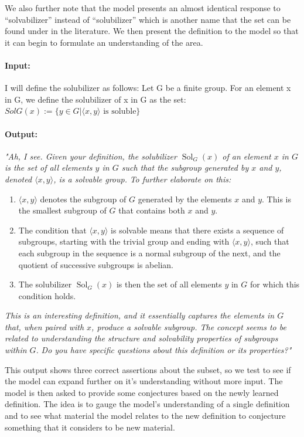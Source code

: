 \documentclass{article}
\begin{document}
We also further note that the model presents an almost identical response to ``solvabilizer'' instead of ``solubilizer'' which is another name that the set can be found under in the literature. We then present the definition to the model so that it can begin to formulate an understanding of the area.
\paragraph{Input:} I will define the solubilizer as follows: Let G be a finite group. For an element x in G, we define the solubilizer of x in G as the set: \(SolG(x) := \{y \in G | \langle x,y \rangle \text{ is soluble}\}\)
\paragraph{Output:} \textit{"Ah, I see. Given your definition, the solubilizer \( \operatorname{Sol}_G(x) \) of an element \( x \) in \( G \) is the set of all elements \( y \) in \( G \) such that the subgroup generated by \( x \) and \( y \), denoted \( \langle x, y \rangle \), is a solvable group.}
\textit{To further elaborate on this:}
\begin{enumerate}
    \item \( \langle x, y \rangle \) denotes the subgroup of \( G \) generated by the elements \( x \) and \( y \). This is the smallest subgroup of \( G \) that contains both \( x \) and \( y \).
    \item The condition that \( \langle x, y \rangle \) is solvable means that there exists a sequence of subgroups, starting with the trivial group and ending with \( \langle x, y \rangle \), such that each subgroup in the sequence is a normal subgroup of the next, and the quotient of successive subgroups is abelian.
    \item The solubilizer \( \operatorname{Sol}_G(x) \) is then the set of all elements \( y \) in \( G \) for which this condition holds.
\end{enumerate}

\textit{This is an interesting definition, and it essentially captures the elements in \( G \) that, when paired with \( x \), produce a solvable subgroup. The concept seems to be related to understanding the structure and solvability properties of subgroups within \( G \).}
\textit{Do you have specific questions about this definition or its properties?"}

This output shows three correct assertions about the subset, so we test to see if the model can expand further on it's understanding without more input. The model is then asked to provide some conjectures based on the newly learned definition. The idea is to gauge the model's understanding of a single definition and to see what material the model relates to the new definition to conjecture something that it considers to be new material.
\end{document}
